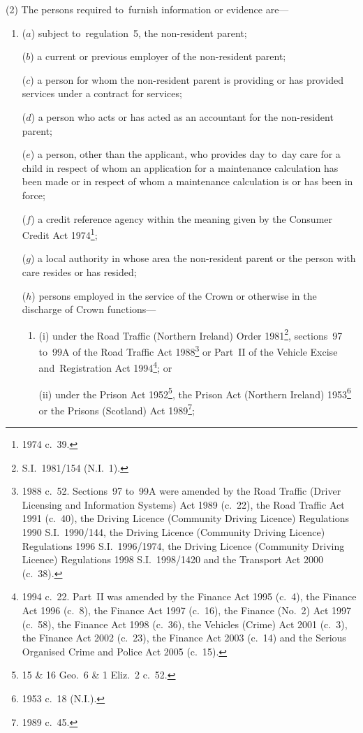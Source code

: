 \documentclass[12pt,a4paper]{article}
\begin{document}
(2) The persons required to~furnish information or evidence are—
\begin{enumerate}\item[]
($a$) subject to~regulation~5, the non-resident parent;

($b$) a current or previous employer of the non-resident parent;

($c$) a person for whom the non-resident parent is providing or has provided services under a contract for services;

($d$) a person who acts or has acted as an accountant for the non-resident parent;

($e$) a person, other than the applicant, who provides day to~day care for a child in respect of whom an application for a maintenance calculation has been made or in respect of whom a maintenance calculation is or has been in force;

($f$) a credit reference agency within the meaning given by the Consumer Credit Act 1974\footnote{1974 c.~39.};

($g$) a local authority in whose area the non-resident parent or the person with care resides or has resided;

($h$) persons employed in the service of the Crown or otherwise in the discharge of Crown functions—
\begin{enumerate}\item[]
(i) under the Road Traffic (Northern Ireland) Order 1981\footnote{S.I.~1981/154 (N.I.~1).}, sections~97 to~99A of the Road Traffic Act 1988\footnote{1988 c.~52. Sections~97 to~99A were amended by the Road Traffic (Driver Licensing and Information Systems) Act 1989 (c.~22), the Road Traffic Act 1991 (c.~40), the Driving Licence (Community Driving Licence) Regulations 1990 S.I.~1990/144, the Driving Licence (Community Driving Licence) Regulations 1996 S.I.~1996/1974, the Driving Licence (Community Driving Licence) Regulations 1998 S.I.~1998/1420 and the Transport Act 2000 (c.~38).} or Part~II of the Vehicle Excise and~Registration Act 1994\footnote{1994 c.~22. Part~II was amended by the Finance Act 1995 (c.~4), the Finance Act 1996 (c.~8), the Finance Act 1997 (c.~16), the Finance (No.~2) Act 1997 (c.~58), the Finance Act 1998 (c.~36), the Vehicles (Crime) Act 2001 (c.~3), the Finance Act 2002 (c.~23), the Finance Act 2003 (c.~14) and the Serious Organised Crime and Police Act 2005 (c.~15).}; or

(ii) under the Prison Act 1952\footnote{15 \& 16 Geo.~6 \& 1 Eliz.~2 c.~52.}, the Prison Act (Northern Ireland) 1953\footnote{1953 c.~18 (N.I.).} or the Prisons (Scotland) Act 1989\footnote{1989 c.~45.};
\end{enumerate}


\end{enumerate}
\end{document}

